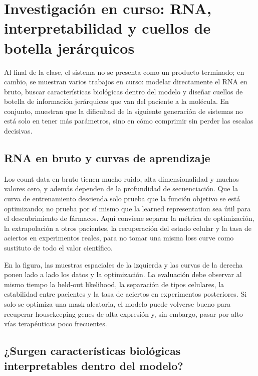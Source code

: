 \section{Investigación en curso: RNA, interpretabilidad y cuellos de botella jerárquicos}

Al final de la clase, el sistema no se presenta como un producto terminado; en cambio, se muestran varios trabajos en curso: modelar directamente el RNA en bruto, buscar características biológicas dentro del modelo y diseñar cuellos de botella de información jerárquicos que van del paciente a la molécula. En conjunto, muestran que la dificultad de la siguiente generación de sistemas no está solo en tener más parámetros, sino en cómo comprimir sin perder las escalas decisivas.

\subsection{RNA en bruto y curvas de aprendizaje}

Los count data en bruto tienen mucho ruido, alta dimensionalidad y muchos valores cero, y además dependen de la profundidad de secuenciación. Que la curva de entrenamiento descienda solo prueba que la función objetivo se está optimizando; no prueba por sí mismo que la learned representation sea útil para el descubrimiento de fármacos. Aquí conviene separar la métrica de optimización, la extrapolación a otros pacientes, la recuperación del estado celular y la tasa de aciertos en experimentos reales, para no tomar una misma loss curve como sustituto de todo el valor científico.


En la figura, las muestras espaciales de la izquierda y las curvas de la derecha ponen lado a lado los datos y la optimización. La evaluación debe observar al mismo tiempo la held-out likelihood, la separación de tipos celulares, la estabilidad entre pacientes y la tasa de aciertos en experimentos posteriores. Si solo se optimiza una mask aleatoria, el modelo puede volverse bueno para recuperar housekeeping genes de alta expresión y, sin embargo, pasar por alto vías terapéuticas poco frecuentes.

\subsection{¿Surgen características biológicas interpretables dentro del modelo?}

